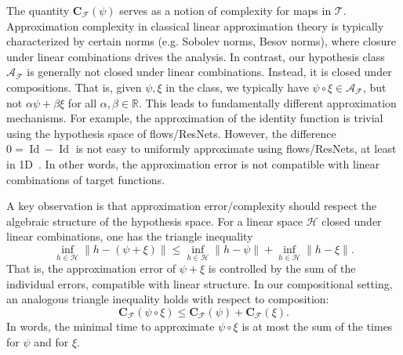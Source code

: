 \documentclass[12pt]{amsart}
\numberwithin{equation}{section}
\theoremstyle{remark}
\begin{document}
The quantity $\mathbf{C}_{\mathcal F}(\psi)$ serves as a notion of complexity for maps in $\mathcal T$.
Approximation complexity in classical linear approximation theory is typically
characterized by certain norms (e.g. Sobolev norms, Besov norms),
where closure under linear combinations drives the analysis.
In contrast, our hypothesis class $\mathcal A_{\mathcal F}$ is generally
not closed under linear combinations.
Instead, it is closed under compositions.
That is, given $\psi,\xi$ in the class, we typically have $\psi\circ \xi\in\mathcal A_{\mathcal F}$, but not $\alpha \psi+\beta \xi$ for all $\alpha, \beta\in \mathbb R$.
This leads to fundamentally different approximation mechanisms.  For example, the approximation of the identity function is trivial using the hypothesis space of flows/ResNets.
However, the difference $0 = \operatorname{Id}-\operatorname{Id}$ is not easy to uniformly approximate using flows/ResNets, at least in 1D~\cite{li2022deep}.
In other words, the approximation error is not compatible with linear combinations of target functions.

A key observation is that approximation error/complexity should respect the algebraic structure of the hypothesis space. For a linear space $\mathcal H$
closed under linear combinations, one has the triangle inequality
\begin{equation}
    \inf_{h\in\mathcal H}\|h-(\psi+\xi)\|\le \inf_{h\in \mathcal H}\|h-\psi\|+\inf_{h\in \mathcal H} \|h-\xi\|.
\end{equation}
That is, the approximation error of $\psi+\xi$ is controlled by
the sum of the individual errors, compatible with linear structure.
In our compositional setting, an analogous triangle inequality holds with respect to composition:
\begin{equation}
    \label{eq:compositional_triangle_inequality}
    \mathbf C_{\mathcal F}(\psi\circ \xi)\le \mathbf C_{\mathcal F}(\psi)+\mathbf C_{\mathcal F}(\xi).
\end{equation}
In words, the minimal time to approximate $\psi\circ \xi$ is at most the sum of the times for $\psi$ and for $\xi$.
\end{document}
